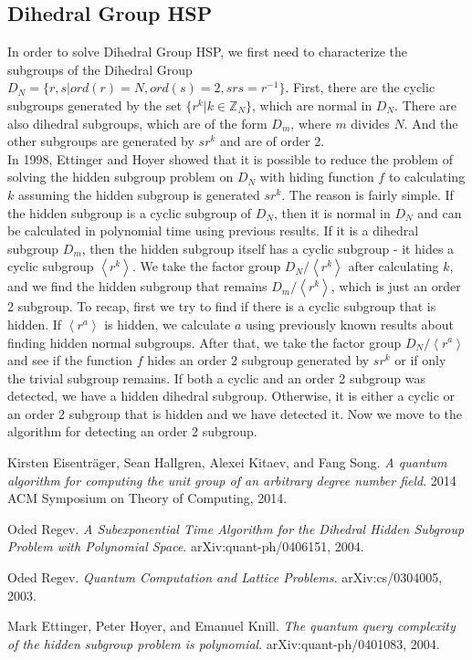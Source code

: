 \documentclass[dvips,12pt]{article}
\theoremstyle{plain}
\theoremstyle{definition}
\begin{document}
\subsection{Dihedral Group HSP}
In order to solve Dihedral Group HSP, we first need to characterize the subgroups of the Dihedral Group $D_N=\lbrace r,s| ord(r)=N,ord(s)=2,srs=r^{-1}\rbrace$. First, there are the cyclic subgroups generated by the set $\lbrace r^k|k\in\mathbb{Z}_N\rbrace$, which are normal in $D_N$. There are also dihedral subgroups, which are of the form $D_m$, where $m$ divides $N$. And the other subgroups are generated by $sr^k$ and are of order 2. \\
In 1998, Ettinger and Hoyer	showed that it is possible to reduce the problem of solving the hidden subgroup problem on $D_N$ with hiding function $f$ to calculating $k$ assuming the hidden subgroup is generated $sr^k$. The reason is fairly simple. If the hidden subgroup is a cyclic subgroup of $D_N$, then it is normal in $D_N$ and can be calculated in polynomial time using previous results. If it is a dihedral subgroup $D_m$, then the hidden subgroup itself has a cyclic subgroup - it hides a cyclic subgroup $\left<r^k\right>$. We take the factor group $D_N/\left<r^k\right>$ after calculating $k$, and we find the hidden subgroup that remains $D_m/\left<r^k\right>$, which is just an order 2 subgroup. To recap, first we try to find if there is a cyclic subgroup that is hidden. If $\left<r^a\right>$ is hidden, we calculate $a$ using previously known results about finding hidden normal subgroups. After that, we take the factor group $D_N/\left<r^a\right>$ and see if the function $f$ hides an order 2 subgroup generated by $sr^k$ or if only the trivial subgroup remains. If both a cyclic and an order 2 subgroup was detected, we have a hidden dihedral subgroup. Otherwise, it is either a cyclic or an order 2 subgroup that is hidden and we have detected it. Now we move to the algorithm for detecting an order 2 subgroup.\\


%

\newpage
%
\begin{thebibliography}{9}

 Kirsten Eisentr{\"a}ger, Sean Hallgren, Alexei Kitaev, and Fang Song.
 \emph{A quantum algorithm for computing the unit group of an arbitrary degree number field}. 2014 ACM Symposium on Theory of Computing, 2014.

 Oded Regev.
 \emph{A Subexponential Time Algorithm for the Dihedral Hidden Subgroup Problem with Polynomial Space}. arXiv:quant-ph/0406151, 2004.
 
 Oded Regev.
 \emph{Quantum Computation and Lattice Problems}. arXiv:cs/0304005, 2003.
 
 Mark Ettinger, Peter Hoyer, and Emanuel Knill.
 \emph{The quantum query complexity of the hidden subgroup problem is polynomial}. arXiv:quant-ph/0401083, 2004.

\end{thebibliography}
%
\end{document}
